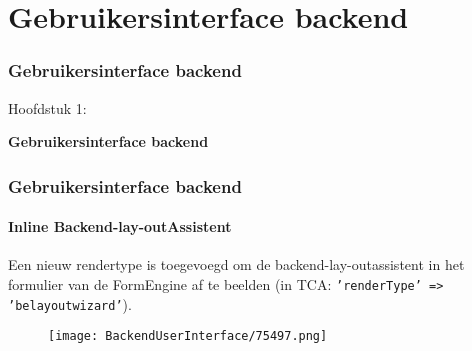 %

\section{Gebruikersinterface backend}
\begin{frame}[fragile]
	\frametitle{Gebruikersinterface backend}

	\begin{center}\huge{Hoofdstuk 1:}\end{center}
	\begin{center}\huge{\color{typo3darkgrey}\textbf{Gebruikersinterface backend}}\end{center}

\end{frame}

\begin{frame}[fragile]
	\frametitle{Gebruikersinterface backend}
	\framesubtitle{Inline Backend-lay-outAssistent}

	Een nieuw rendertype is toegevoegd om de backend-lay-outassistent in het formulier van de
	FormEngine af te beelden (in TCA: \texttt{'renderType' => 'belayoutwizard'}).

	\begin{figure}
		\texttt{[image: BackendUserInterface/75497.png]}
	\end{figure}

\end{frame}


